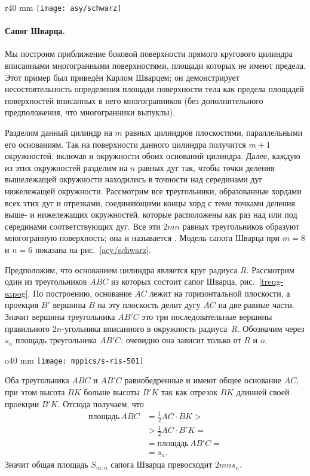 {\small

\begin{wrapfigure}{r}{40 mm}
\centering
\texttt{[image: asy/schwarz]}
\caption{}
\label{acy/schwarz}
\end{wrapfigure}

\paragraph{Сапог Шварца.}\label{fikhtengoltz/3-623b}
Мы построим приближение боковой поверхности прямого кругового цилиндра  вписанными многогранными поверхностями, площади которых не имеют предела.
Этот пример был приведён Карлом Шварцем; он демонстрирует несостоятельность определения площади поверхности тела как предела площадей поверхностей вписанных в него многогранников (без дополнительного предположения, что многогранники выпуклы).

Разделим данный цилиндр на $m$ равных цилиндров плоскостями, параллельными его основаниям.
Так на поверхности данного цилиндра получится $m+1$ окружностей, включая и окружности обоих оснований цилиндра.
Далее, каждую из этих окружностей разделим на $n$ равных дуг так, чтобы точки деления вышележащей окружности находились в точности над серединами дуг нижележащей окружности.
Рассмотрим все треугольники, образованные хордами всех этих дуг и отрезками, соединяющими концы хорд с теми точками деления выше- и нижележащих окружностей, которые расположены как раз над или под серединами соответствующих дуг.
Все эти $2mn$ равных треугольников образуют многогранную поверхность; 
она и называется .
Модель сапога Шварца при $m=8$ и $n=6$ показана на рис.~\ref{acy/schwarz}.

Предположим, что основанием цилиндра является круг радиуса $R$.
Рассмотрим один из треугольников $ABC$ из которых состоит сапог Шварца, рис.~\ref{treug-sapog}.
По построению, основание $AC$ лежит на горизонтальной плоскости,
а проекция $B'$ вершины $B$ на эту плоскость делит дугу $AC$ на две равные части.
Значит вершины треугольника $AB'C$ это три последовательные вершины правильного $2n$-угольника вписанного в окружность радиуса~$R$.
Обозначим через $s_n$ площадь треугольника $AB'C$; очевидно она зависит только от $R$ и $n$.

\begin{wrapfigure}[8]{o}{40 mm}
\centering
\texttt{[image: mppics/s-ris-501]}
\caption{}\label{treug-sapog}
\end{wrapfigure}
 
Оба треугольника $ABC$ и $AB'C$ равнобедренные и имеют общее основание $AC$;
при этом высота $BK$ больше высоты $B'K$ так как отрезок $BK$ длинней своей проекции $B'K$.
Отсюда получаем, что
\begin{align*}
\text{площадь}\, ABC&=\tfrac12 AC\cdot BK>
\\
&>\tfrac12 AC\cdot B'K=
\\
&=\text{площадь}\, AB'C=
\\
&=s_n.
\end{align*}
Значит общая площадь $S_{m,n}$ сапога Шварца превосходит $2mns_n$.

}
